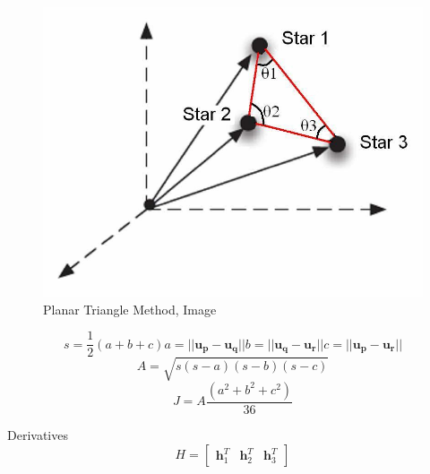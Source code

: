 \documentclass[12pt,a4paper,oneside]{article}
\begin{document}
\begin{figure}[ht]
\includegraphics[scale=0.30]{planar_triangle_method.jpg}
\centering
\caption{Planar Triangle Method, Image \citet{cole2006fast}}
\label{fig:planar_triangle_method}
\end{figure}

\citet{cole2006fast}\par

\begin{subequations}
\begin{equation}
s = \frac{1}{2}(a + b + c)
\end{equation}
\begin{equation}
a = ||\bm{u_p} - \bm{u_q}||
\end{equation}
\begin{equation}
b = ||\bm{u_q} - \bm{u_r}||
\end{equation}
\begin{equation}
c = ||\bm{u_p} - \bm{u_r}||
\end{equation}
\end{subequations}
\begin{equation}
A = \sqrt{s(s-a)(s-b)(s-c)}
\end{equation}
\begin{equation}
J = A\frac{(a^2 + b^2 + c^2)}{36}
\end{equation}

Derivatives
\begin{equation}
H = \begin{bmatrix}
\bm{h}_1^T & \bm{h}_2^T & \bm{h}_3^T
\end{bmatrix}
\end{equation}
\end{document}
